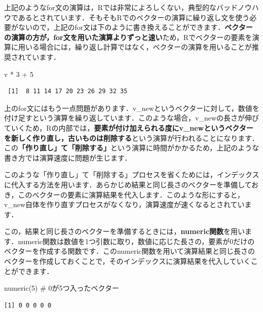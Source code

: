 \documentclass[
  letterpaper,
  DIV=11,
  numbers=noendperiod]{scrreprt}
\newenvironment{Shaded}{\begin{snugshade}}{\end{snugshade}}
\newcommand{\CommentTok}[1]{\textcolor[rgb]{0.37,0.37,0.37}{#1}}
\newcommand{\DecValTok}[1]{\textcolor[rgb]{0.68,0.00,0.00}{#1}}
\newcommand{\FunctionTok}[1]{\textcolor[rgb]{0.28,0.35,0.67}{#1}}
\newcommand{\NormalTok}[1]{\textcolor[rgb]{0.00,0.23,0.31}{#1}}
\newcommand{\SpecialCharTok}[1]{\textcolor[rgb]{0.37,0.37,0.37}{#1}}
\begin{document}
上記のようなfor文の演算は，Rでは非常によろしくない，典型的なバッドノウハウであるとされています．そもそもRでのベクターの演算に繰り返し文を使う必要がないので，上記のfor文は下のように書き換えることができます．\textbf{ベクターの演算の方が，for文を用いた演算よりずっと速い}ため，Rでベクターの要素を演算に用いる場合には，繰り返し計算ではなく，ベクターの演算を用いることが推奨されています．

\begin{Shaded}
\begin{Highlighting}[]
\NormalTok{v }\SpecialCharTok{*} \DecValTok{3} \SpecialCharTok{+} \DecValTok{5}
\end{Highlighting}
\end{Shaded}

\begin{verbatim}
 [1]  8 11 14 17 20 23 26 29 32 35
\end{verbatim}

上のfor文にはもう一点問題があります．v\_newというベクターに対して，数値を付け足すという演算を繰り返しています．このような場合，v\_newの長さが伸びていくため，Rの内部では，\textbf{要素が付け加えられる度にv\_newというベクターを新しく作り直し，古いものは削除する}という演算が行われることになります．この\textbf{「作り直し」て「削除する」}という演算に時間がかかるため，上記のような書き方では演算速度に問題が生じます．

このような「作り直し」て「削除する」プロセスを省くためには，インデックスに代入する方法を用います．あらかじめ結果と同じ長さのベクターを準備しておき，このベクターの要素に演算結果を代入します．このような形にすると，v\_new自体を作り直すプロセスがなくなり，演算速度が速くなるとされています．

この，結果と同じ長さのベクターを準備するときには，\textbf{numeric関数}を用います．numeric関数は数値を1つ引数に取り，数値に応じた長さの，要素が0だけのベクターを作成する関数です．このnumeric関数を用いて演算結果と同じ長さのベクターを作成しておくことで，そのインデックスに演算結果を代入していくことができます．

\begin{Shaded}
\begin{Highlighting}[]
\FunctionTok{numeric}\NormalTok{(}\DecValTok{5}\NormalTok{) }\CommentTok{\# 0が5つ入ったベクター}
\end{Highlighting}
\end{Shaded}

\begin{verbatim}
[1] 0 0 0 0 0
\end{verbatim}
\end{document}
